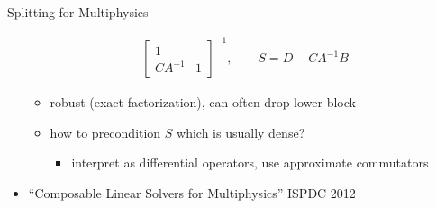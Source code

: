 \begin{frame}{Splitting for Multiphysics}
\begin{itemize}
\begin{align*}
      \begin{bmatrix}
        1 & \\ CA^{-1} & 1
      \end{bmatrix}^{-1}, \qquad
      S = D - C A^{-1} B
    \end{align*}
    \begin{itemize}
    \item robust (exact factorization), can often drop lower block
    \item how to precondition $S$ which is usually dense?
      \begin{itemize}
      \item interpret as differential operators, use approximate commutators
      \end{itemize}
    \end{itemize}
  \item ``Composable Linear Solvers for Multiphysics'' ISPDC 2012
  \end{itemize}
\end{frame}
